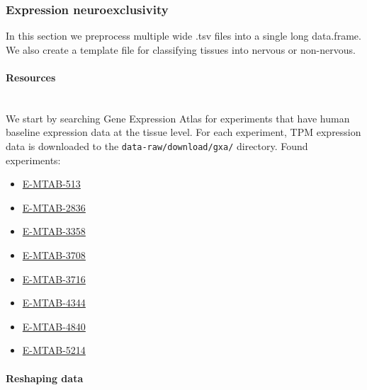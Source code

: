 \hypertarget{expression-neuroexclusivity}{%
\subsubsection{Expression
neuroexclusivity}\label{expression-neuroexclusivity}}

In this section we preprocess multiple wide .tsv files into a single
long data.frame. We also create a template file for classifying tissues
into nervous or non-nervous.

\hypertarget{resources}{%
\paragraph{\texorpdfstring{\textbf{Resources}}{Resources}}\label{resources}}

\texttt{}\\
We start by searching Gene Expression Atlas for experiments that have
human baseline expression data at the tissue level. For each experiment,
TPM expression data is downloaded to the \texttt{data-raw/download/gxa/}
directory. Found experiments:

\begin{itemize}
\tightlist
\item
  \href{https://www.ebi.ac.uk/gxa/experiments/E-MTAB-513}{E-MTAB-513}
\item
  \href{https://www.ebi.ac.uk/gxa/experiments/E-MTAB-2836}{E-MTAB-2836}
\item
  \href{https://www.ebi.ac.uk/gxa/experiments/E-MTAB-3358}{E-MTAB-3358}
\item
  \href{https://www.ebi.ac.uk/gxa/experiments/E-MTAB-3708}{E-MTAB-3708}
\item
  \href{https://www.ebi.ac.uk/gxa/experiments/E-MTAB-3716}{E-MTAB-3716}
\item
  \href{https://www.ebi.ac.uk/gxa/experiments/E-MTAB-4344}{E-MTAB-4344}
\item
  \href{https://www.ebi.ac.uk/gxa/experiments/E-MTAB-4840}{E-MTAB-4840}
\item
  \href{https://www.ebi.ac.uk/gxa/experiments/E-MTAB-5214}{E-MTAB-5214}
\end{itemize}

\hypertarget{reshaping-data}{%
\paragraph{\texorpdfstring{\textbf{Reshaping
data}}{Reshaping data}}\label{reshaping-data}}

